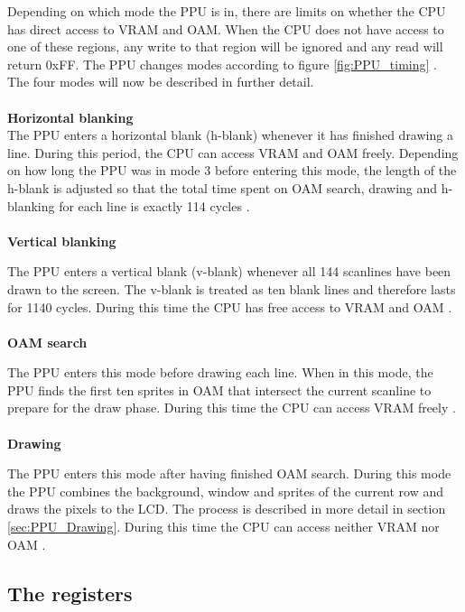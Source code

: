 Depending on which mode the PPU is in, there are limits on whether the CPU has direct access to VRAM and OAM. When the CPU does not have access to one of these regions, any write to that region will be ignored and any read will return 0xFF. The PPU changes modes according to figure \ref{fig:PPU_timing} \cite{pandocsVideo}. The four modes will now be described in further detail.\\
\\
\textbf{Horizontal blanking}
\\
The PPU enters a horizontal blank (h-blank) whenever it has finished drawing a line. During this period, the CPU can access VRAM and OAM freely. Depending on how long the PPU was in mode 3 before entering this mode, the length of the h-blank is adjusted so that the total time spent on OAM search, drawing and h-blanking for each line is exactly 114 cycles \cite{pandocsVideo}.\\
\\
\textbf{Vertical blanking}

The PPU enters a vertical blank (v-blank) whenever all 144 scanlines have been drawn to the screen. The v-blank is treated as ten blank lines and therefore lasts for 1140 cycles. During this time the CPU has free access to VRAM and OAM \cite{pandocsVideo}.\\
\\
\textbf{OAM search}

The PPU enters this mode before drawing each line. When in this mode, the PPU finds the first ten sprites in OAM that intersect the current scanline to prepare for the draw phase. During this time the CPU can access VRAM freely \cite{pandocsVideo}. \\
\\
\textbf{Drawing}

The PPU enters this mode after having finished OAM search. During this mode the PPU combines the background, window and sprites of the current row and draws the pixels to the LCD. The process is described in more detail in section \ref{sec:PPU_Drawing}. During this time the CPU can access neither VRAM nor OAM \cite{pandocsVideo}. 

\subsection{The registers}
\label{sec:PPU_Registers}

